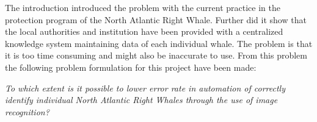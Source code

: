 The introduction introduced the problem with the current practice in the protection program of the North Atlantic Right Whale. Further did it show that the local authorities and institution have been provided with a centralized knowledge system maintaining data of each individual whale.
The problem is that it is too time consuming and might also be inaccurate to use.
From this problem the following problem formulation for this project have been made:

\begin{center}
	\emph{To which extent is it possible to lower error rate in automation of correctly identify individual North Atlantic Right Whales through the use of image recognition?}
\end{center}
